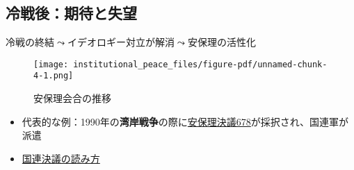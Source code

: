 \documentclass[
  xelatex,
  ja=standard]{bxjsarticle}
\providecommand{\tightlist}{%
  \setlength{\itemsep}{0pt}\setlength{\parskip}{0pt}}\usepackage{longtable,booktabs,array}
\begin{document}
\hypertarget{ux51b7ux6226ux5f8cux671fux5f85ux3068ux5931ux671b}{%
\subsection{冷戦後：期待と失望}\label{ux51b7ux6226ux5f8cux671fux5f85ux3068ux5931ux671b}}

冷戦の終結\(\leadsto\)イデオロギー対立が解消\(\leadsto\)安保理の活性化

\begin{figure}[htpb]

{\centering \texttt{[image: institutional\_peace\_files/figure-pdf/unnamed-chunk-4-1.png]}

}

\caption{安保理会合の推移}

\end{figure}

\begin{itemize}
\tightlist
\item
  代表的な例：1990年の\textbf{湾岸戦争}の際に\href{https://digitallibrary.un.org/record/102245}{安保理決議678}が採択され、国連軍が派遣
\item
  \href{https://research.un.org/en/docs/resolutions}{国連決議の読み方}
\end{itemize}
\end{document}

